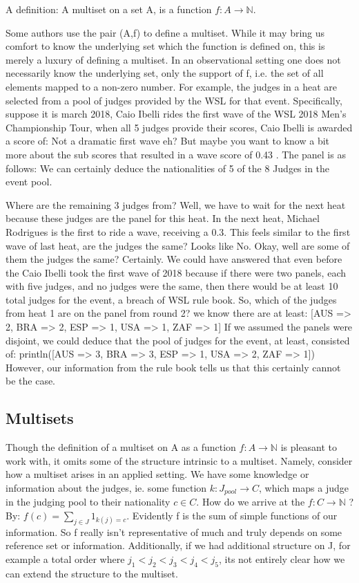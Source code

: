 \documentclass{article}
\theoremstyle{definition}
\begin{document}
A definition: A multiset on a set A, is a function $f:A\rightarrow\mathbb{N}$.

Some authors use the pair (A,f) to define a multiset. While it may bring us comfort to know the underlying set which the function is defined on, this is merely a luxury of defining a multiset. In an observational setting one does not necessarily know the underlying set, only the support of f, i.e. the set of all elements mapped to a non-zero number. For example, the judges in a heat are selected from a pool of judges provided by the WSL for that event. Specifically, suppose it is march 
2018, Caio Ibelli rides the first wave of the WSL 2018 Men's Championship Tour, when all 5 judges provide their scores, Caio Ibelli is awarded a score of:
Not a dramatic first wave eh? But maybe you want to know a bit more about the sub scores that resulted in a wave score of 0.43 . The panel is as follows:
We can certainly deduce the nationalities of 5 of the 8 Judges in the event pool.

Where are the remaining 3 judges from? Well, we have to wait for the next heat because these judges are the panel for this heat. In the next heat, Michael Rodrigues is the first to ride a wave, receiving a 0.3.
This feels similar to the first wave of last heat, are the judges the same?
Looks like No. Okay, well are some of them the judges the same? Certainly. We could have answered that even before the Caio Ibelli took the first wave of 2018 because if there were two panels, each with five judges, and no judges were the same, then there would be at least 10 total judges for the event, a breach of WSL rule book. So, which of the judges from heat 1 are on the panel from round 2?
we know there are at least:
[AUS => 2, BRA => 2, ESP => 1, USA => 1, ZAF => 1]
 If we assumed the panels were disjoint, we could deduce that the pool of judges for the event, at least, consisted of:
println([AUS => 3, BRA => 3, ESP => 1, USA => 2, ZAF => 1])
However, our information from the rule book tells us that this certainly cannot be the case.

\subsection{Multisets}
Though the definition of a multiset on A as a function $f:A\rightarrow\mathbb{N}$ is pleasant to work with, it omits some of the structure intrinsic to a multiset. Namely, consider how a multiset arises in an applied setting. We have some knowledge or information about the judges, ie. some function $k: J_{pool} → C$, which maps a judge in the judging pool to their nationality $c\in C$. How do we arrive at the $f:C\rightarrow\mathbb{N}$ ? By: $f(c) = \sum_{j\in J} 1_{k(j)=c}$. Evidently f is the sum of simple functions of our information. So f really isn't representative of much and truly depends on some reference set or information. Additionally, if we had additional structure on J, for example a total order where $j_1<j_2<j_3 <j_4<j_5$, its not entirely clear how we can extend the structure to the multiset.
\end{document}
